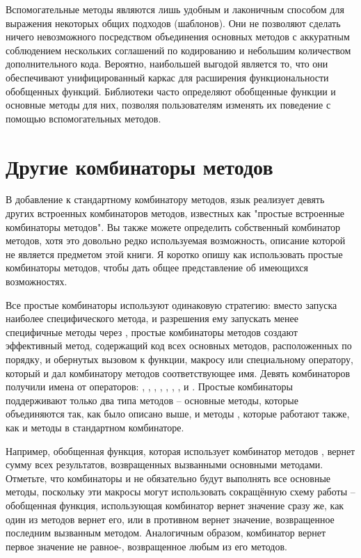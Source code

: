 Вспомогательные методы являются лишь удобным и лаконичным способом для выражения некоторых
общих подходов (шаблонов).  Они не позволяют сделать ничего невозможного посредством
объединения основных методов с аккуратным соблюдением нескольких соглашений по кодированию
и небольшим количеством дополнительного кода. Вероятно, наибольшей выгодой является то,
что они обеспечивают унифицированный каркас для расширения функциональности обобщенных
функций.  Библиотеки часто определяют обобщенные функции и основные методы для них,
позволяя пользователям изменять их поведение с помощью вспомогательных методов.

\section{Другие комбинаторы методов}

В добавление к стандартному комбинатору методов, язык реализует девять других встроенных
комбинаторов методов, известных как "простые встроенные комбинаторы методов".  Вы также
можете определить собственный комбинатор методов, хотя это довольно редко используемая
возможность, описание которой не является предметом этой книги.  Я коротко опишу как
использовать простые комбинаторы методов, чтобы дать общее представление об имеющихся
возможностях.

Все простые комбинаторы используют одинаковую стратегию: вместо запуска наиболее
специфического метода, и разрешения ему запускать менее специфичные методы через
, простые комбинаторы методов создают эффективный метод, содержащий
код всех основных методов, расположенных по порядку, и обернутых вызовом к функции,
макросу или специальному оператору, который и дал комбинатору методов соответствующее имя.
Девять комбинаторов получили имена от операторов: \code{+}, , ,
, , , ,  и .  Простые
комбинаторы поддерживают только два типа методов -- основные методы, которые объединяются
так, как было описано выше, и методы , которые работают также, как и методы
 в стандартном комбинаторе.

Например, обобщенная функция, которая использует комбинатор методов \code{+}, вернет сумму
всех результатов, возвращенных вызванными основными методами.  Отметьте, что комбинаторы
 и  не обязательно будут выполнять все основные методы, поскольку эти
макросы могут использовать сокращённую схему работы -- обобщенная функция, использующая
комбинатор  вернет значение  сразу же, как один из методов вернет его,
или в противном вернет значение, возвращенное последним вызванным методом.  Аналогичным
образом, комбинатор  вернет первое значение не равное-, возвращенное
любым из его методов.


